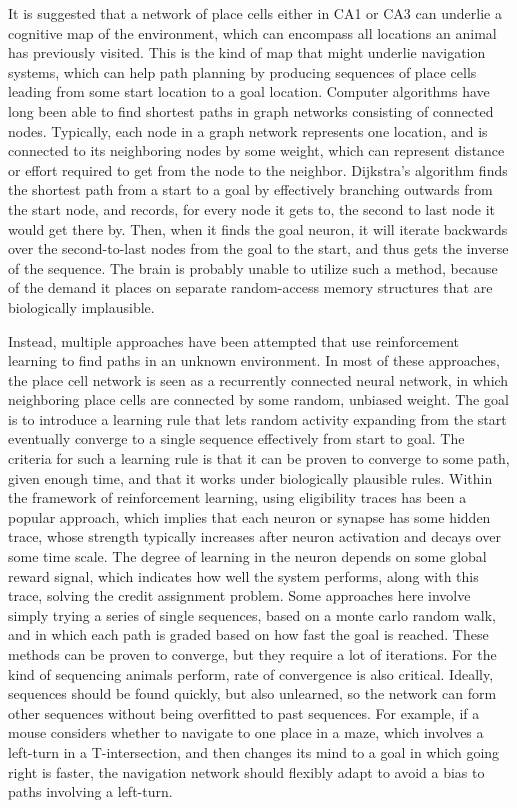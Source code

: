 \documentclass{article}
\begin{document}
    It is suggested that a network of place cells either in CA1 or CA3 can underlie a cognitive map of the environment, which can encompass all locations an animal has previously visited. This is the kind of map that might underlie navigation systems, which can help path planning by producing sequences of place cells leading from some start location to a goal location.
    Computer algorithms have long been able to find shortest paths in graph networks consisting of connected nodes. Typically, each node in a graph network represents one location, and is connected to its neighboring nodes by some weight, which can represent distance or effort required to get from the node to the neighbor.
    Dijkstra’s algorithm finds the shortest path from a start to a goal by effectively branching outwards from the start node, and records, for every node it gets to, the second to last node it would get there by. Then, when it finds the goal neuron, it will iterate backwards over the second-to-last nodes from the goal to the start, and thus gets the inverse of the sequence. The brain is probably unable to utilize such a method, because of the demand it places on separate random-access memory structures that are biologically implausible.
    
    Instead, multiple approaches have been attempted that use reinforcement learning to find paths in an unknown environment. In most of these approaches, the place cell network is seen as a recurrently connected neural network, in which neighboring place cells are connected by some random, unbiased weight. The goal is to introduce a learning rule that lets random activity expanding from the start eventually converge to a single sequence effectively from start to goal. The criteria for such a learning rule is that it can be proven to converge to some path, given enough time, and that it works under biologically plausible rules. 
    Within the framework of reinforcement learning, using eligibility traces has been a popular approach, which implies that each neuron or synapse has some hidden trace, whose strength typically increases after neuron activation and decays over some time scale. The degree of learning in the neuron depends on some global reward signal, which indicates how well the system performs, along with this trace, solving the credit assignment problem. 
    Some approaches here involve simply trying a series of single sequences, based on a monte carlo random walk, and in which each path is graded based on how fast the goal is reached. These methods can be proven to converge, but they require a lot of iterations. For the kind of sequencing animals perform, rate of convergence is also critical. Ideally, sequences should be found quickly, but also unlearned, so the network can form other sequences without being overfitted to past sequences. 
    For example, if a mouse considers whether to navigate to one place in a maze, which involves a left-turn in a T-intersection, and then changes its mind to a goal in which going right is faster, the navigation network should flexibly adapt to avoid a bias to paths involving a left-turn.
    
\end{document}
